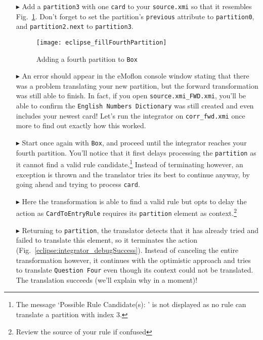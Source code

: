 \begin{itemize}

\item[$\blacktriangleright$] Add a \texttt{partition3} with one \texttt{card} to your \texttt{source.xmi} so that it resembles
Fig.~\ref{eclipse:fourthPartitionStart}. Don't forget to set the partition's \texttt{previous} attribute to \texttt{partition0}, and \texttt{partition2.next} to
\texttt{partition3}.

\begin{figure}[htbp]
\begin{center}
  \texttt{[image: eclipse\_fillFourthPartition]}
  \caption{Adding a fourth partition to \texttt{Box}}
  \label{eclipse:fourthPartitionStart}
\end{center}
\end{figure}

\item[$\blacktriangleright$] An error should appear in the eMoflon console window stating that there was a problem translating your new partition, but the
forward transformation was still able to finish. In fact, if you open \texttt{source\-.xmi\_FWD\-.xmi}, you'll be able to confirm the \texttt{Eng\-lish
Numb\-ers Dict\-ion\-ary} was still created and even includes your newest card! Let's run the integrator on \texttt{corr\_fwd.xmi} once more to find out
exactly how this worked.

\item[$\blacktriangleright$] Start once again with \texttt{Box}, and proceed until the integrator reaches your fourth partition. You'll notice that it
first delays processing the \texttt{partition} as it cannot find a valid rule candidate.\footnote{The message `Possible Rule Candidate(s): ' is not displayed
as no rule can translate a partition with index 3.} Instead of terminating however, an exception is thrown and the translator tries its best to continue anyway,
by going ahead and trying to process \texttt{card}.

\item[$\blacktriangleright$] Here the transformation is able to find a valid rule but opts to delay the action as \texttt{CardToEntryRule} requires its
\texttt{partition} element as context.\footnote{Review the source of your rule if confused}

\item[$\blacktriangleright$] Returning to \texttt{partition}, the translator detects that it has already tried and failed to translate this element, so it
terminates the action (Fig.~\ref{eclipse:integrator_debugSuccess}). Instead of canceling the entire transformation however, it continues with the optimistic
approach and tries to translate \texttt{Question Four} even though its context could not be translated. The translation succeeds (we'll explain why in a
moment)!


\end{itemize}
